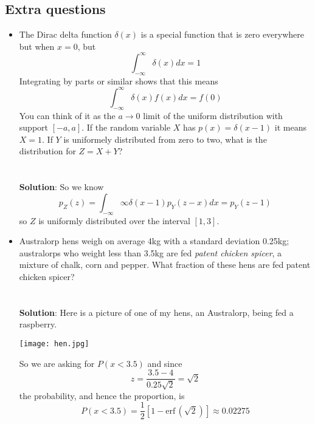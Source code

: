 \documentclass[11pt,a4paper]{scrartcl}
\begin{document}
\subsection*{Extra questions}

\begin{itemize}

\item The Dirac delta function $\delta(x)$ is a special function that is zero everywhere but when $x=0$, but
$$
    \int_{-\infty}^\infty\delta(x)dx=1
    $$
Integrating by parts or similar shows that this means
$$
    \int_{-\infty}^\infty\delta(x)f(x)dx=f(0)
    $$
You can think of it as the $a\rightarrow 0$ limit of the uniform distribution with support $[-a,a]$. If the random variable $X$ has $p(x)=\delta(x-1)$ it means $X=1$. If $Y$ is uniformely distributed from zero to two, what is the distribution for $Z=X+Y$?
\\ \\ \\ \textbf{Solution}: So we know
$$p_Z(z)=\int_{-\infty}\infty \delta(x-1)p_Y(z-x)dx=p_Y(z-1)$$
so $Z$ is uniformly distributed over the interval $[1,3]$.

\item Australorp hens weigh on average 4kg with a standard deviation
  0.25kg; australorps who weight less than 3.5kg are fed
  \textsl{patent chicken spicer}, a mixture of chalk, corn and
  pepper. What fraction of these hens are fed patent chicken spicer?
  \\ \\ \\ \textbf{Solution}: Here is a picture of one of my hens, an Australorp, being fed a raspberry.
  \begin{center}
    \texttt{[image: hen.jpg]}
  \end{center}
  So we are asking for $P(x<3.5)$ and since
  $$z=\frac{3.5-4}{0.25\sqrt{2}}=\sqrt{2}$$
    the probability, and hence the proportion, is
    $$P(x<3.5)=\frac{1}{2}[1-\mbox{erf}\,(\sqrt{2})]\approx 0.02275$$
  
\end{itemize}
\end{document}
